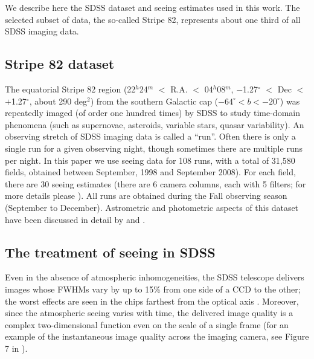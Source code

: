 

We describe here the SDSS dataset and seeing estimates used in this work. The
selected subset of data, the so-called Stripe 82, represents about one third of
all SDSS imaging data. 

\subsection{Stripe 82 dataset} 

The equatorial Stripe 82 region (22$^h$24$^m$ $<$ R.A. $<$ 04$^h$08$^m$, 
$-$1.27$^\circ$  $<$ Dec $<$ $+$1.27$^\circ$, about 
290 deg$^2$) from the southern Galactic cap ($-64^\circ < b <  -20^\circ$) was repeatedly imaged (of order
one hundred times) by SDSS to study time-domain phenomena (such as supernovae, asteroids, variable stars, quasar 
variability).  An observing stretch of SDSS imaging data is called a ``run''. Often there is only a single
run for a given observing night, though sometimes there are multiple
runs per night. In this paper we use seeing data for 
108 runs, with a total of 31,580 fields, obtained between September, 1998 and September 2008). 
For each field, there are 30 seeing estimates (there are 6 camera columns, each with 5 filters; for more
details please \citealt{Gunn2006}). All runs are obtained during the Fall observing season (September to 
December). Astrometric and photometric aspects of this dataset have been discussed in detail by 
\cite{Ivezic2007} and \cite{Sesar2007}. 


\subsection{The treatment of seeing in SDSS}
 
Even in the absence of atmospheric inhomogeneities, the SDSS telescope delivers images whose 
FWHMs vary by up to 15\% from one side of a CCD to the other; the worst effects are seen in 
the chips farthest from the optical axis \citep{Gunn2006}. Moreover, since the atmospheric 
seeing varies with time, the delivered image quality is a complex two-dimensional function 
even on the scale of a single frame (for an example of the instantaneous image quality across 
the imaging camera, see Figure 7 in \citealt{SDSSEDR}). 
 
